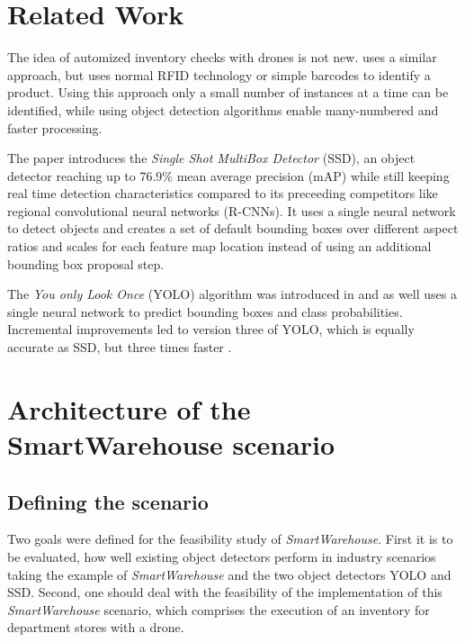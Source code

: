 \documentclass[a4paper, 10pt, journal]{wissarbIEEE}      %
\begin{document}
\section{Related Work} \label{relatedwork}

The idea of automized inventory checks with drones is not new. \cite{doks.innovationGmbH.2020} uses a similar approach, but uses normal RFID technology or simple barcodes to identify a product. Using this approach only a small number of instances at a time can be identified, while using object detection algorithms enable many-numbered and faster processing. 

The paper \cite{WeiLiuDragomirAnguelovDumitruErhanChristianSzegedyScottReedChengYangFuAlexander.2016} introduces the \textit{Single Shot MultiBox Detector} (SSD), an object detector reaching up to 76.9\% mean average precision (mAP) while still keeping real time detection characteristics compared to its preceeding competitors like regional convolutional neural networks (R-CNNs). It uses a single neural network to detect objects and creates a set of default bounding boxes over different aspect ratios and scales for each feature map location instead of using an additional bounding box proposal step. 

The \textit{You only Look Once} (YOLO) algorithm was introduced in \cite{JosephRedmonSantoshDivvalaRossGirshickAliFarhadi.2016} and as well uses a single neural network to predict bounding boxes and class probabilities. Incremental improvements led to version three of YOLO, which is equally accurate as SSD, but three times faster \cite{JosephRedmon.2018}. 

\section{Architecture of the SmartWarehouse scenario} \label{architecture}

\subsection{Defining the scenario}

Two goals were defined for the feasibility study of \textit{SmartWarehouse}. First it is to be evaluated, how well existing object detectors perform in industry scenarios taking the example of \textit{SmartWarehouse} and the two object detectors YOLO and SSD. Second, one should deal with the feasibility of the implementation of this \textit{SmartWarehouse} scenario, which comprises the execution of an inventory for department stores with a drone. 
\end{document}
